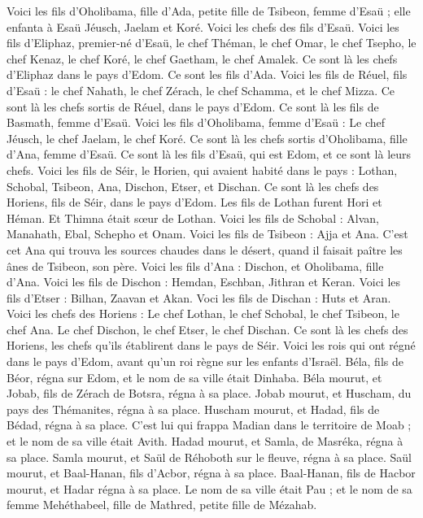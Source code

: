 \begin{multicols}{2}
Voici les fils d'Oholibama, fille d’Ada, petite fille de Tsibeon, femme d'Esaü ; elle enfanta à Esaü Jéusch, Jaelam et Koré.
Voici les chefs des fils d'Esaü. Voici les fils d'Eliphaz, premier-né d'Esaü, le chef Théman, le chef Omar, le chef Tsepho, le chef Kenaz,
le chef Koré, le chef Gaetham, le chef Amalek. Ce sont là les chefs d'Eliphaz dans le  pays d'Edom. Ce sont les fils d’Ada.
Voici les fils de Réuel, fils d'Esaü : le chef Nahath, le chef Zérach, le chef Schamma, et le chef Mizza. Ce sont là les chefs sortis de Réuel, dans le pays d'Edom.  Ce sont là les fils de Basmath, femme d'Esaü.
Voici les fils d'Oholibama, femme d'Esaü : Le chef Jéusch, le chef Jaelam, le chef Koré. Ce sont là les chefs sortis d'Oholibama, fille d’Ana, femme d'Esaü.
Ce sont là les fils d'Esaü, qui est Edom, et ce sont là leurs chefs.
Voici les fils de Séir, le Horien, qui avaient habité dans le pays : Lothan, Schobal, Tsibeon, Ana,
Dischon, Etser, et Dischan. Ce sont là les chefs des Horiens, fils de Séir, dans le pays d'Edom.
Les fils de Lothan furent Hori et Héman.  Et Thimna était sœur de Lothan.
Voici les fils de Schobal : Alvan, Manahath, Ebal, Schepho et Onam.
Voici les fils de Tsibeon : Ajja et Ana. C’est cet Ana qui trouva les sources chaudes dans le désert, quand il faisait paître les ânes de Tsibeon, son père.
Voici les fils d’Ana : Dischon, et Oholibama, fille d’Ana.
Voici les fils de Dischon : Hemdan, Eschban, Jithran et Keran.
Voici les fils d'Etser : Bilhan, Zaavan et Akan.
Voci les fils de Dischan : Huts et Aran.
Voici les chefs des Horiens : Le chef Lothan, le chef Schobal, le chef Tsibeon, le chef Ana.
Le chef Dischon, le chef Etser, le chef Dischan. Ce sont là les chefs des Horiens, les chefs qu’ils établirent dans le pays de Séir.
Voici les rois qui ont régné dans le pays d'Edom, avant qu’un roi règne sur les enfants d'Israël.
Béla, fils de Béor, régna sur Edom, et le nom de sa ville était Dinhaba.
Béla mourut, et Jobab, fils de Zérach de Botsra, régna à sa place.
Jobab mourut, et Huscham, du pays des Thémanites, régna à sa place.
Huscham mourut, et Hadad, fils de Bédad, régna à sa place. C’est lui qui frappa Madian dans le territoire de Moab ; et le nom de sa ville était Avith.
Hadad mourut, et Samla, de Masréka, régna à sa place.
Samla mourut, et Saül de Réhoboth sur le fleuve, régna à sa place.
Saül mourut, et Baal-Hanan, fils d’Acbor, régna à sa place.
Baal-Hanan, fils de Hacbor mourut, et Hadar régna à sa place. Le nom de sa ville était Pau ; et le nom de sa femme Mehéthabeel, fille de Mathred, petite fille de Mézahab.

\end{multicols}
